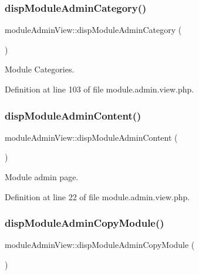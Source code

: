 \subsubsection{\texorpdfstring{disp\+Module\+Admin\+Category()}{dispModuleAdminCategory()}}
{\footnotesize\ttfamily module\+Admin\+View\+::disp\+Module\+Admin\+Category (\begin{DoxyParamCaption}{ }\end{DoxyParamCaption})}



Module Categories. 



Definition at line 103 of file module.\+admin.\+view.\+php.

\mbox{\label{classmoduleAdminView_a1b5edba3a516dd443b323743330ded45}} 
\subsubsection{\texorpdfstring{disp\+Module\+Admin\+Content()}{dispModuleAdminContent()}}
{\footnotesize\ttfamily module\+Admin\+View\+::disp\+Module\+Admin\+Content (\begin{DoxyParamCaption}{ }\end{DoxyParamCaption})}



Module admin page. 



Definition at line 22 of file module.\+admin.\+view.\+php.

\mbox{\label{classmoduleAdminView_aa9846c36dd6d640677eb6c9ac237e28f}} 
\subsubsection{\texorpdfstring{disp\+Module\+Admin\+Copy\+Module()}{dispModuleAdminCopyModule()}}
{\footnotesize\ttfamily module\+Admin\+View\+::disp\+Module\+Admin\+Copy\+Module (\begin{DoxyParamCaption}{ }\end{DoxyParamCaption})}



